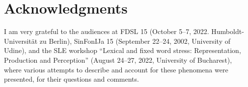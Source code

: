 \documentclass[output=paper,colorlinks,citecolor=black,koreanfont]{langscibook}
\begin{document}
\section*{Acknowledgments}
I am very grateful to the audiences at FDSL 15 (October 5--7, 2022. Humboldt-Universität zu Berlin), SinFonIJa 15 (September 22--24, 2002, University of Udine), and the SLE workshop ``Lexical and fixed word stress: Representation, Production and Perception'' (August 24--27, 2022, University of Bucharest), where various attempts to describe and account for these phenomena were presented, for their questions and comments.

\printbibliography[heading=subbibliography,notkeyword=this]
\end{document}
